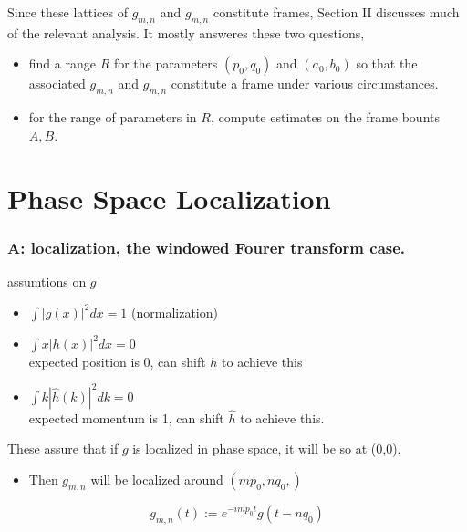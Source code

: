 \documentclass{beamer}
\begin{document}
\begin{frame}

\begin{flushleft}
Since these lattices of $g_{m,n}$ and $g_{m,n}$ constitute frames, Section II discusses much of the relevant analysis. It mostly answeres these two questions,
\end{flushleft}

\begin{itemize}
\item find a range $R$ for the parameters $(p_0, q_0)$ and $(a_0, b_0)$ so that the associated $g_{m,n}$ and $g_{m,n}$ constitute a frame under various circumstances.
\item for the range of parameters in $R$, compute estimates on the frame bounts $A,B$.
\end{itemize}


\end{frame}








\section{Phase Space Localization}




\begin{frame}
\frametitle{A: localization, the windowed Fourer transform case.}

assumtions on $g$
\begin{itemize}
\item $ \int|g(x)|^2 dx = 1 $ (normalization) \\
\item $ \int x |h(x)|^2 dx = 0 $ \\
\indent expected position is 0, can shift $h$ to achieve this
\item $ \int k |\hat h(k)|^2 dk = 0 $ \\
\indent expected momentum is 1, can shift $\hat h$ to achieve this.
\end{itemize}

\begin{flushleft}
These assure that if $g$ is localized in phase space, it will be so at (0,0).
\end{flushleft}

\begin{itemize}
\item Then $g_{m,n}$ will be localized around $( m p_0,n q_0,  )$
\end{itemize}

\begin{equation*}
g_{m,n} (t) := e^{-i m p_0 t} g(t - n q_0)
\end{equation*}


\end{frame}
\end{document}

